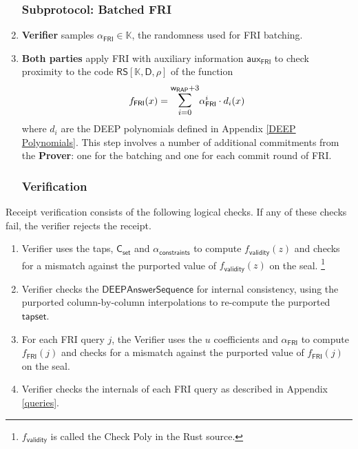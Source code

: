 \documentclass[10pt,letterpaper,titlepage]{article}
\theoremstyle{definition}
\begin{document}
\begin{enumerate}
  \subsubsection{Subprotocol: Batched FRI}
  \item \textbf{Verifier} samples $\alpha_\mathsf{FRI}\in\mathbb{K}$, the randomness used for FRI batching.
  \item \textbf{Both parties} apply FRI with auxiliary information $\mathsf{aux}_\mathsf{FRI}$ to check proximity to the code $\mathsf{RS}[\mathbb{K},\mathsf{D},\rho]$ of the function
    \[
      f_\mathsf{FRI}(x)=
      \mathlarger{
      \mathlarger{\sum}}_{i=0}^{
        \mathsf{w}_\mathsf{RAP}+3
        }
        \alpha_\mathsf{FRI}^i\cdot d_i(x)
    \]
    where $d_i$ are the DEEP polynomials defined in Appendix \ref{DEEP Polynomials}.
  This step involves a number of additional commitments from the \textbf{Prover}: one for the batching and one for each commit round of FRI.

  \subsubsection{Verification}
\end{enumerate}
  Receipt verification consists of the following logical checks. If any of these checks fail, the verifier rejects the receipt. \\
    \begin{enumerate}
      \item Verifier uses the taps, $\mathsf{C_{set}}$ and $\alpha_\mathsf{constraints}$ to compute $f_\mathsf{validity}(z)$ and checks for a mismatch against the purported value of $f_\mathsf{validity}(z)$ on the seal.%
      \footnote{$f_\mathsf{validity}$ is called the Check Poly in the Rust source.}
      \item Verifier checks the $\mathsf{DEEPAnswerSequence}$ for internal consistency, using the purported column-by-column interpolations to re-compute the purported $\mathsf{tapset}$.
      \item For each FRI query $j$, the Verifier uses the $u$ coefficients and $\alpha_\mathsf{FRI}$ to compute $f_\mathsf{FRI}(j)$ and checks for a mismatch against the purported value of $f_\mathsf{FRI}(j)$ on the seal.
      \item Verifier checks the internals of each FRI query as described in Appendix \ref{queries}.
    \end{enumerate}
\end{document}
